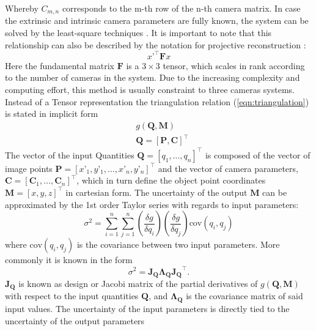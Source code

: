 \documentclass[5p,times,procedia]{elsarticle}
\begin{document}
%
Whereby $C_{m,n}$ corresponds to the m-th row of the n-th camera matrix.
In case the extrinsic and intrinsic camera parameters are fully known, the system can be solved by the least-square techniques \cite{Ahn2004}.
%
It is important to note that this relationship can also be described by the notation for projective reconstruction \cite{Hartley2018}:\\
\begin{equation}
	\label{eqn:ProjectiveReconstruction}
	x’^{\top}\mathbf{F}x
\end{equation}
%
Here the fundamental matrix $\mathbf{F}$ is a $3\times 3$ tensor, which scales in rank according to the number of cameras in the system. Due to the increasing complexity and computing effort, this method is usually constraint to three cameras systems. Instead of a Tensor representation the triangulation relation (\ref{eqn:triangulation}) is stated in implicit form\\
%
\begin{equation}
	\label{eqn:ImplicitFrom}
	\begin{aligned}
		& g(\mathbf{Q},\mathbf{M}) \\
		& \mathbf{Q} = [\mathbf{P},\mathbf{C}]^{\top}
	\end{aligned}
\end{equation}
%
The vector of the input Quantities $\mathbf{Q} = \left[q_1,\dots, q_{n}\right]^{\top}$ is composed of the vector of image points $\mathbf{P} = [x’_1,y’_1, \dots ,x’_n,y’_n]^{\top}$ and the vector of camera parameters, $\mathbf{C} = \left[ \mathbf{C}_1 , \dots , \mathbf{C}_n \right]^{\top}$, which in turn define the object point coordinates $\mathbf{M} =  [x,y,z]^{\top}$ in cartesian form. The uncertainty of the output $\mathbf{M}$ can be approximated by the 1st order Taylor series with regards to input parameters:\\
%
\begin{equation}
	\sigma^2 = \sum_{i=1}^{n}\sum_{j=1}^{n} \left(\frac{\delta g}{\delta q_i}\right) \left(\frac{\delta g}{\delta q_j}\right) \mathrm{cov}(q_i, q_j) 
\end{equation}
where $\mathrm{cov}(q_i, q_j) $ is the covariance between two input parameters. More commonly it is known in the form~\cite{Cox2006}  
\begin{equation}
	\sigma^2 = \mathbf{J_{Q}}\mathbf{\Lambda_{Q}}\mathbf{J_{Q}}^{\top}.
\end{equation}
$\mathbf{J_{Q}}$ is known as design or Jacobi matrix of the partial derivatives of $g\left(\mathbf{Q},\mathbf{M}\right)$ with respect to the input quantities $\mathbf{Q}$, and $\mathbf{\Lambda_Q}$ is the covariance matrix of said input values. The uncertainty of the input parameters is directly tied to the uncertainty of the output parameters \\
\end{document}
